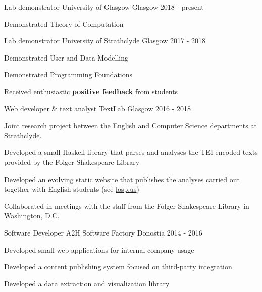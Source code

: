 \documentclass[11pt, a4paper]{awesome-cv}
\begin{document}

\begin{cventries}

    \cventry
      {Lab demonstrator} %
      {University of Glasgow} %
      {Glasgow} %
      {2018 - present} %
      {
        \begin{cvitems} %
          \item {Demonstrated Theory of Computation}
        \end{cvitems}
      }

    \cventry
      {Lab demonstrator} %
      {University of Strathclyde} %
      {Glasgow} %
      {2017 - 2018} %
      {
        \begin{cvitems} %
          \item {Demonstrated User and Data Modelling}
          \item {Demonstrated Programming Foundations}
          \item {Received enthusiastic \textbf{positive feedback} from students}
        \end{cvitems}
      }

    \cventry
      {Web developer \& text analyst} %
      {TextLab}
      {Glasgow} %
      {2016 - 2018} %
      {
        Joint research project between the English and Computer Science
        departments at Strathclyde.\vspace{1.1\baselineskip}
        \begin{cvitems} %
          \item {Developed a small Haskell library that parses and analyses the
              TEI-encoded texts provided by the Folger Shakespeare Library}
          \item {Developed an evolving static website that publishes the
              analyses carried out together with English students (see
                \url{losp.us})}
          \item {Collaborated in meetings with the staff from the Folger
              Shakespeare Library in Washington, D.C.}
        \end{cvitems}
      }

    \cventry
      {Software Developer} %
      {A2H Software Factory} %
      {Donostia} %
      {2014 - 2016} %
      {
        \begin{cvitems} %
          \item {Developed small web applications for internal company usage}
          \item {Developed a content publishing system focused on third-party
              integration}
          \item {Developed a data extraction and visualization library}
        \end{cvitems}
      }


\end{cventries}
\end{document}
